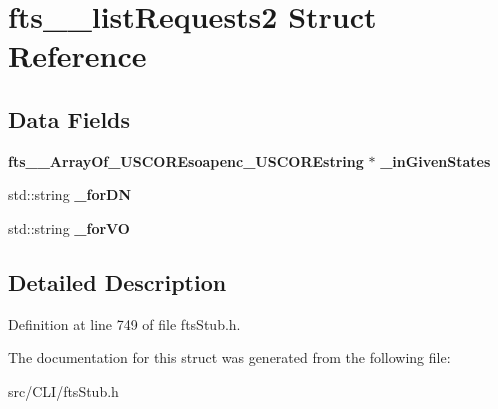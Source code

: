 \section{fts\_\-\_\-listRequests2 Struct Reference}
\label{structfts____listRequests2}
\subsection*{Data Fields}
\begin{DoxyCompactItemize}
\item 
{\bf fts\_\-\_\-ArrayOf\_\-USCOREsoapenc\_\-USCOREstring} $\ast$ {\bfseries \_\-inGivenStates}\label{structfts____listRequests2_a0f057ac40a751397f007c5a0d039eced}

\item 
std::string {\bfseries \_\-forDN}\label{structfts____listRequests2_aac16f5a1014c90ffa9ed42badff9b6dc}

\item 
std::string {\bfseries \_\-forVO}\label{structfts____listRequests2_aac2a08ecd2fa5267a7414d075d6a3e84}

\end{DoxyCompactItemize}


\subsection{Detailed Description}


Definition at line 749 of file ftsStub.h.



The documentation for this struct was generated from the following file:\begin{DoxyCompactItemize}
\item 
src/CLI/ftsStub.h\end{DoxyCompactItemize}
